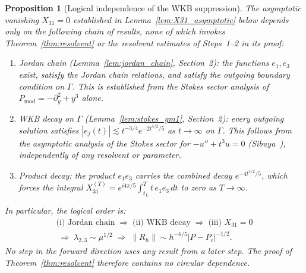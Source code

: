 \documentclass[12pt,a4paper]{amsart}
\newtheorem{proposition}[theorem]{Proposition}
\theoremstyle{remark}
\begin{document}
\begin{proposition}[Logical independence of the WKB suppression]
\label{prop:wkb_independence}
The asymptotic vanishing $X_{31} = 0$ established in
Lemma~\ref{lem:X31_asymptotic} below depends only on the following chain
of results, none of which invokes Theorem~\ref{thm:resolvent} or the
resolvent estimates of Steps~1--2 in its proof:
\begin{enumerate}
  \item[\emph{(i)}] \emph{Jordan chain} (Lemma~\ref{lem:jordan_chain},
    Section~2): the functions $e_1, e_3$ exist, satisfy the Jordan chain
    relations, and satisfy the outgoing boundary condition on $\Gamma$.
    This is established from the Stokes sector analysis of
    $P_{\mathrm{mod}} = -\partial_y^2 + y^3$ alone.
  \item[\emph{(ii)}] \emph{WKB decay on $\Gamma$} (Lemma~\ref{lem:stokes_gm1},
    Section~2): every outgoing solution satisfies
    $|e_j(t)| \lesssim t^{-3/4}e^{-2t^{5/2}/5}$ as $t\to\infty$ on $\Gamma$.
    This follows from the asymptotic analysis of the Stokes sector for
    $-u''+t^3 u = 0$ (Sibuya~\cite{Sibuya75}), independently of any
    resolvent or parameter.
  \item[\emph{(iii)}] \emph{Product decay}: the product $e_1 e_3$ carries
    the combined decay $e^{-4t^{5/2}/5}$, which forces the integral
    $X_{31}^{(T)} = e^{i4\pi/5}\int_{t_L}^T t\,e_1 e_3\,dt$ to zero as
    $T \to \infty$.
\end{enumerate}
In particular, the logical order is:
\begin{gather*}
  \text{(i) Jordan chain}
  \;\Rightarrow\;
  \text{(ii) WKB decay}
  \;\Rightarrow\;
  \text{(iii) } X_{31} = 0 \\
  \;\Rightarrow\;
  \lambda_{2,3} \sim \mu^{1/2}
  \;\Rightarrow\;
  \|R_h\| \sim h^{-6/5}|P-P_c|^{-1/2}.
\end{gather*}
No step in the forward direction uses any result from a later step.
The proof of Theorem~\ref{thm:resolvent} therefore contains no circular
dependence.
\end{proposition}
\end{document}
